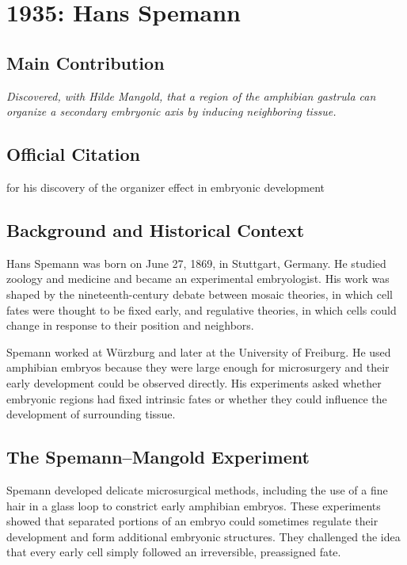 \chapter[1935 --- Spemann]{1935: Hans Spemann}
\label{ch:1935_hansspemann}

\section*{Main Contribution}

\textit{Discovered, with Hilde Mangold, that a region of the amphibian gastrula can organize a secondary embryonic axis by inducing neighboring tissue.}\cite{nobel-1935,lecture-1935}

\section{Official Citation}

for his discovery of the organizer effect in embryonic development\cite{nobel-1935}

\section{Background and Historical Context}

Hans Spemann was born on June 27, 1869, in Stuttgart, Germany. He studied zoology and medicine and became an experimental embryologist. His work was shaped by the nineteenth-century debate between mosaic theories, in which cell fates were thought to be fixed early, and regulative theories, in which cells could change in response to their position and neighbors.

Spemann worked at Würzburg and later at the University of Freiburg. He used amphibian embryos because they were large enough for microsurgery and their early development could be observed directly. His experiments asked whether embryonic regions had fixed intrinsic fates or whether they could influence the development of surrounding tissue.

\section{The Spemann--Mangold Experiment}

Spemann developed delicate microsurgical methods, including the use of a fine hair in a glass loop to constrict early amphibian embryos. These experiments showed that separated portions of an embryo could sometimes regulate their development and form additional embryonic structures. They challenged the idea that every early cell simply followed an irreversible, preassigned fate.

